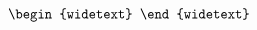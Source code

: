 \documentclass[reprint,hidelinks]{revtex4-2}
\begin{document}
\begin{widetext}
\begin{equation}
\begin{aligned}
\begin{widetext}
%
%

\end{widetext}
\end{aligned}
\end{equation}
\end{widetext}
\end{document}
